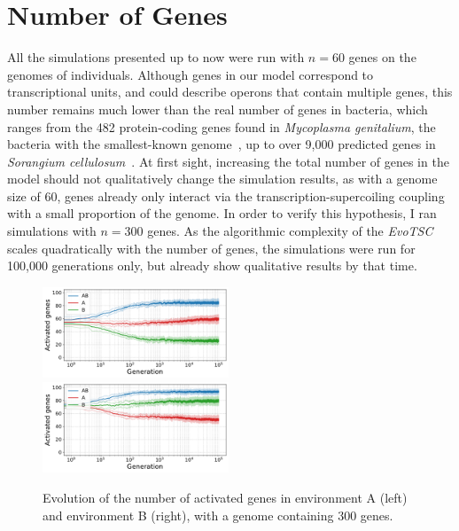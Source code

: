 \FloatBlock


\section{Number of Genes}
\label{sec:param:300-genes}

All the simulations presented up to now were run with $n = 60$ genes on the genomes of individuals.
Although genes in our model correspond to transcriptional units, and could describe operons that contain multiple genes, this number remains much lower than the real number of genes in bacteria, which ranges from the 482 protein-coding genes found in \emph{Mycoplasma genitalium}, the bacteria with the smallest-known genome~\citep{glass2006}, up to over 9,000 predicted genes in \emph{Sorangium cellulosum}~\citep{schneiker2007}.
At first sight, increasing the total number of genes in the model should not qualitatively change the simulation results, as with a genome size of 60, genes already only interact via the transcription-supercoiling coupling with a small proportion of the genome.
In order to verify this hypothesis, I ran simulations with $n = 300$ genes.
As the algorithmic complexity of the \emph{EvoTSC} scales quadratically with the number of genes, the simulations were run for 100,000 generations only, but already show qualitative results by that time.

\begin{figure}[H]
\centering
\includegraphics[width=0.495\textwidth]{param/300-genes/gene_activity_env_A.pdf}
\includegraphics[width=0.495\textwidth]{param/300-genes/gene_activity_env_B.pdf}
\caption[Evolution of the number of activated genes in each environment, with a 300-gene genome]{Evolution of the number of activated genes in environment A (left) and environment B (right), with a genome containing 300 genes.}
\label{fig:param:300genes-activ-by-env}
\end{figure}


